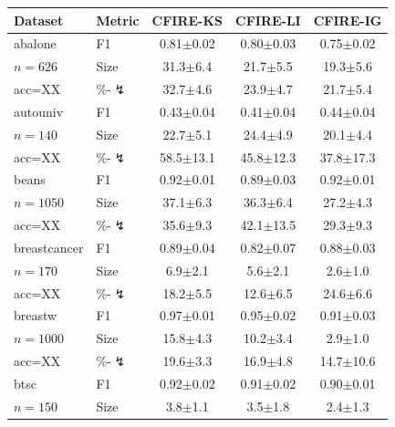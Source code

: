 \begin{tabular}{llccc}
\toprule
Dataset & Metric & CFIRE-KS & CFIRE-LI & CFIRE-IG \\
\midrule
abalone & F1 & 0.81{\scriptsize$\pm$0.02} & 0.80{\scriptsize$\pm$0.03} & 0.75{\scriptsize$\pm$0.02} \\
$n=626$ & Size & 31.3{\scriptsize$\pm$6.4} & 21.7{\scriptsize$\pm$5.5} & 19.3{\scriptsize$\pm$5.6} \\
acc=XX & \%-$\lightning$ & 32.7{\scriptsize$\pm$4.6} & 23.9{\scriptsize$\pm$4.7} & 21.7{\scriptsize$\pm$5.4} \\
\midrule
autouniv & F1 & 0.43{\scriptsize$\pm$0.04} & 0.41{\scriptsize$\pm$0.04} & 0.44{\scriptsize$\pm$0.04} \\
$n=140$ & Size & 22.7{\scriptsize$\pm$5.1} & 24.4{\scriptsize$\pm$4.9} & 20.1{\scriptsize$\pm$4.4} \\
acc=XX & \%-$\lightning$ & 58.5{\scriptsize$\pm$13.1} & 45.8{\scriptsize$\pm$12.3} & 37.8{\scriptsize$\pm$17.3} \\
\midrule
beans & F1 & 0.92{\scriptsize$\pm$0.01} & 0.89{\scriptsize$\pm$0.03} & 0.92{\scriptsize$\pm$0.01} \\
$n=1050$ & Size & 37.1{\scriptsize$\pm$6.3} & 36.3{\scriptsize$\pm$6.4} & 27.2{\scriptsize$\pm$4.3} \\
acc=XX & \%-$\lightning$ & 35.6{\scriptsize$\pm$9.3} & 42.1{\scriptsize$\pm$13.5} & 29.3{\scriptsize$\pm$9.3} \\
\midrule
breastcancer & F1 & 0.89{\scriptsize$\pm$0.04} & 0.82{\scriptsize$\pm$0.07} & 0.88{\scriptsize$\pm$0.03} \\
$n=170$ & Size & 6.9{\scriptsize$\pm$2.1} & 5.6{\scriptsize$\pm$2.1} & 2.6{\scriptsize$\pm$1.0} \\
acc=XX & \%-$\lightning$ & 18.2{\scriptsize$\pm$5.5} & 12.6{\scriptsize$\pm$6.5} & 24.6{\scriptsize$\pm$6.6} \\
\midrule
breastw & F1 & 0.97{\scriptsize$\pm$0.01} & 0.95{\scriptsize$\pm$0.02} & 0.91{\scriptsize$\pm$0.03} \\
$n=1000$ & Size & 15.8{\scriptsize$\pm$4.3} & 10.2{\scriptsize$\pm$3.4} & 2.9{\scriptsize$\pm$1.0} \\
acc=XX & \%-$\lightning$ & 19.6{\scriptsize$\pm$3.3} & 16.9{\scriptsize$\pm$4.8} & 14.7{\scriptsize$\pm$10.6} \\
\midrule
btsc & F1 & 0.92{\scriptsize$\pm$0.02} & 0.91{\scriptsize$\pm$0.02} & 0.90{\scriptsize$\pm$0.01} \\
$n=150$ & Size & 3.8{\scriptsize$\pm$1.1} & 3.5{\scriptsize$\pm$1.8} & 2.4{\scriptsize$\pm$1.3} \\

\end{tabular}
